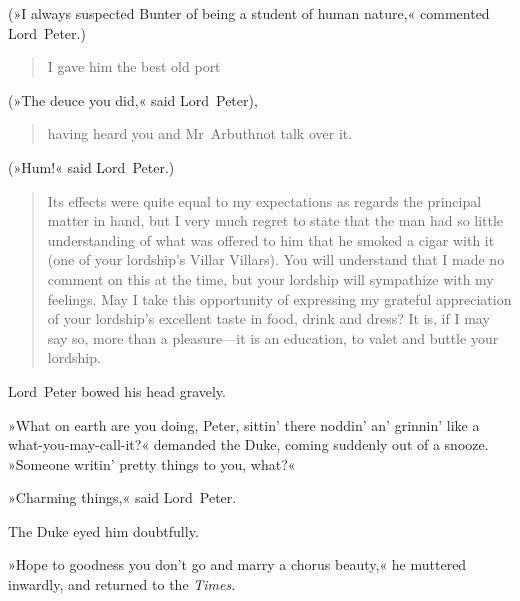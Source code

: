(»I always suspected Bunter of being a student of human nature,« commented Lord~Peter.)

\begin{quotation}
I gave him the best old port 
\end{quotation}

(»The deuce you did,« said Lord~Peter), 

\begin{quotation}
having heard you and Mr~Arbuthnot talk over it.
\end{quotation}

 (»Hum!« said Lord~Peter.)

\begin{quotation}
Its effects were quite equal to my expectations as regards the principal matter in hand, but I very much regret to state that the man had so little understanding of what was offered to him that he smoked a cigar with it (one of your lordship's Villar Villars). You will understand that I made no comment on this at the time, but your lordship will sympathize with my feelings. May I take this opportunity of expressing my grateful appreciation of your lordship's excellent taste in food, drink and dress? It is, if I may say so, more than a pleasure—it is an education, to valet and buttle your lordship.
\end{quotation}

Lord~Peter bowed his head gravely.

»What on earth are you doing, Peter, sittin' there noddin' an' grinnin' like a what-you-may-call-it?« demanded the Duke, coming suddenly out of a snooze. »Someone writin' pretty things to you, what?«

»Charming things,« said Lord~Peter.

The Duke eyed him doubtfully.

»Hope to goodness you don't go and marry a chorus beauty,« he muttered inwardly, and returned to the \textit{Times}.

